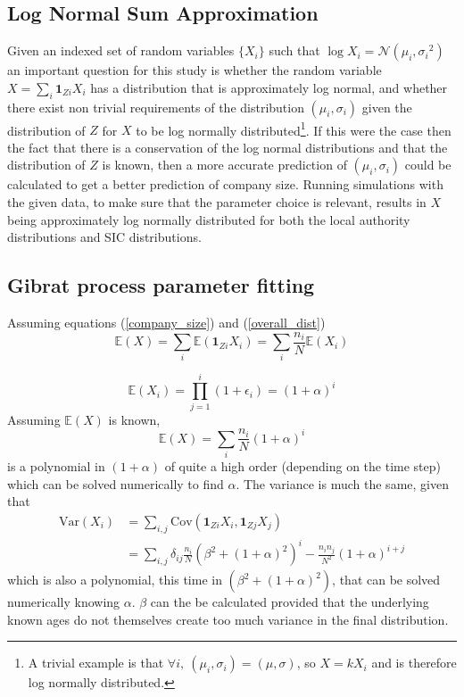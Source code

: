 \documentclass[a4paper,10pt]{article}
\begin{document}
\subsection{Log Normal Sum Approximation}
Given an indexed set of random variables $\{X_i\}$ such that $\log X_i = \mathcal{N}(\mu_i, {\sigma_i}^2)$ an important question for this study is whether the random variable $X = \sum_i\mathbf{1}_{Zi}X_i$ has a distribution that is approximately log normal, and whether there exist non trivial requirements of the distribution ${(\mu_i, \sigma_i)}$ given the distribution of $Z$ for $X$ to be log normally distributed\footnote{A trivial example is that $\forall i, \ (\mu_i, \sigma_i) = (\mu, \sigma)$, so $X = kX_i$ and is therefore log normally distributed.}. If this were the case then the fact that there is a conservation of the log normal distributions and that the distribution of $Z$ is known, then a more accurate prediction of ${(\mu_i, \sigma_i)}$ could be calculated to get a better prediction of company size.
Running simulations with the given data, to make sure that the parameter choice is relevant, results in $X$ being approximately log normally distributed for both the local authority distributions and SIC distributions. %
\subsection{Gibrat process parameter fitting}
Assuming equations (\ref{company_size}) and (\ref{overall_dist})
\begin{equation}
 \mathbb{E}(X) = \sum_i\mathbb{E} (\mathbf{1}_{Zi}X_i) = \sum_i\frac{n_i}{N}\mathbb{E}(X_i)  
\end{equation}

\begin{equation}
 \mathbb{E}(X_i) = \prod_{j = 1}^i(1 + \epsilon_i) = (1 + \alpha)^i
\end{equation}
Assuming $\mathbb{E}(X)$ is known,
\begin{equation}
 \mathbb{E}(X) =\sum_i\frac{n_i}{N}(1 + \alpha)^i
\end{equation}
is a polynomial in $(1 + \alpha)$ of quite a high order (depending on the time step) which can be solved numerically to find $\alpha$.
The variance is much the same, given that 
\begin{align}
 \mathrm{Var}(X_i) &= \sum_{i,j}\mathrm{Cov}(\mathbf{1}_{Zi}X_i,\mathbf{1}_{Zj}X_j) \\&= \sum_{i,j} \delta_{ij}\frac{n_i}{N}(\beta^2 + (1+\alpha)^2)^i - \frac{n_in_j}{N^2}(1 + \alpha)^{i + j}
\end{align}
which is also a polynomial, this time in $(\beta^2 + (1+\alpha)^2)$, that can be solved numerically knowing $\alpha$. $\beta$ can the be calculated provided that the underlying known ages do not themselves create too much variance in the final distribution.
\end{document}
